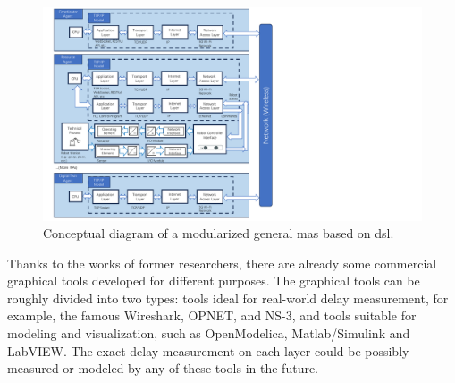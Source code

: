 \begin{figure}[htb]
    \centering
    \includegraphics[width=\textwidth]{figures/methodology/DSLConceptual.pdf}
    \caption{Conceptual diagram of a modularized general \gls{mas} based on \gls{dsl}. \label{fig: DSLConceptual}}
\end{figure}
        


Thanks to the works of former researchers, there are already some commercial graphical tools 
developed for different purposes. The graphical tools 
can be roughly divided into two types: tools ideal for real-world delay measurement, 
for example, the famous Wireshark, OPNET, and NS-3, 
and tools suitable for modeling and visualization, such as OpenModelica, 
Matlab/Simulink and LabVIEW. The exact delay measurement on each layer could be possibly 
measured or modeled by any of these tools in the future.